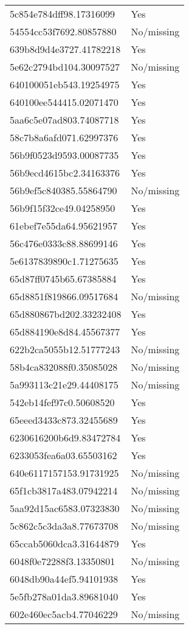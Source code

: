\begin{tabular}{ll}
5c854e784dff98.17316099 & Yes \\
54554cc53f7692.80857880 & No/missing \\
639b8d9d4e3727.41782218 & Yes \\
5e62c2794bd104.30097527 & No/missing \\
640100051eb543.19254975 & Yes \\
640100ee544415.02071470 & Yes \\
5aa6c5e07ad803.74087718 & Yes \\
58c7b8a6afd071.62997376 & Yes \\
56b9f0523d9593.00087735 & Yes \\
56b9ecd4615bc2.34163376 & Yes \\
56b9ef5c840385.55864790 & No/missing \\
56b9f15f32ce49.04258950 & Yes \\
61ebef7e55da64.95621957 & Yes \\
56c476e0333c88.88699146 & Yes \\
5e6137839890c1.71275635 & Yes \\
65d87ff0745b65.67385884 & Yes \\
65d8851f819866.09517684 & No/missing \\
65d880867bd202.33232408 & Yes \\
65d884190e8d84.45567377 & Yes \\
622b2ca5055b12.51777243 & No/missing \\
58b4ca832088f0.35085028 & No/missing \\
5a993113c21e29.44408175 & No/missing \\
542eb14fef97c0.50608520 & Yes \\
65eeed3433c873.32455689 & Yes \\
6230616200b6d9.83472784 & Yes \\
6233053fea6a03.65503162 & Yes \\
640e6117157153.91731925 & No/missing \\
65f1cb3817a483.07942214 & No/missing \\
5aa92d15ac6583.07323830 & No/missing \\
5c862c5c3da3a8.77673708 & No/missing \\
65ccab5060dca3.31644879 & Yes \\
6048f0e72288f3.13350801 & No/missing \\
6048db90a44ef5.94101938 & Yes \\
5e5fb278a01da3.89681040 & Yes \\
602e460ec5acb4.77046229 & No/missing \\

\end{tabular}
